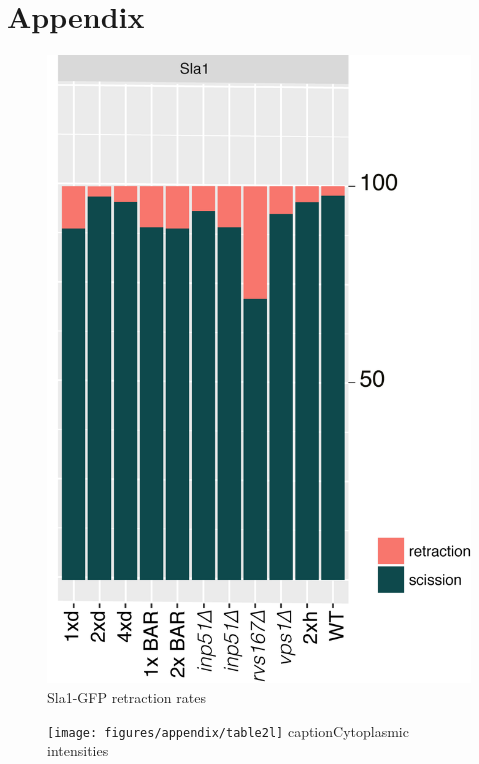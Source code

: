 \chapter*{Appendix} %

\begin{figure}[H]
\includegraphics[scale=1.5]{figures/appendix/retraction_rates_all}
\caption{Sla1-GFP retraction rates}
\end{figure}


\begin{figure}[H]
	\texttt{[image: figures/appendix/table2l]}
	caption{Cytoplasmic intensities}
\end{figure}